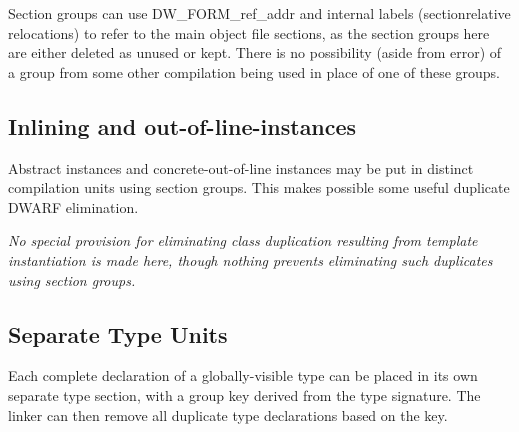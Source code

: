 Section groups can use DW\-\_FORM\-\_ref\-\_addr and internal labels
(section\dash relative relocations) to refer to the main object
file sections, as the section groups here are either deleted
as unused or kept. There is no possibility (aside from error)
of a group from some other compilation being used in place
of one of these groups.


\subsection{Inlining and out-of-line-instances}
\label{app:inliningandoutoflineinstances}

Abstract instances and concrete-out-of-line instances may be
put in distinct compilation units using section groups. This
makes possible some useful duplicate DWARF elimination.

\textit{No special provision for eliminating class duplication
resulting from template instantiation is made here, though
nothing prevents eliminating such duplicates using section
groups.}


\subsection{Separate Type Units}
\label{app:separatetypeunits}

Each complete declaration of a globally-visible type can be
placed in its own separate type section, with a group key
derived from the type signature. The linker can then remove
all duplicate type declarations based on the key.

